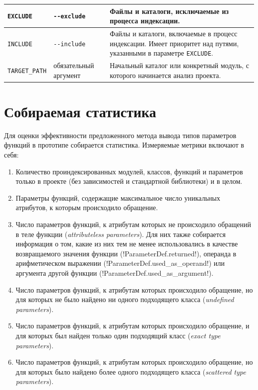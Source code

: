 \begin{table}[H]
\begin{tabularx}{\textwidth}{ |X|X|X| }
    \texttt{EXCLUDE} & \texttt{-{}-exclude} & Файлы и каталоги, исключаемые из
    процесса индексации.
    \\ \hline

    \texttt{INCLUDE} & \texttt{-{}-include} & Файлы и каталоги, включаемые в
    процесс индексации. Имеет приоритет над путями, указанными в параметре
    \texttt{EXCLUDE}.
    \\ \hline

    \texttt{TARGET\_PATH} & обязательный аргумент & Начальный каталог или
    конкретный модуль, с которого начинается анализ проекта.
    \\ \hline

  \end{tabularx}
\end{table}

\section{Собираемая статистика}
\label{sec:statistics-collecting}

Для оценки эффективности предложенного метода вывода типов параметров функций
в прототипе собирается статистика. Измеряемые метрики включают в себя:

\begin{enumerate}
  \item Количество проиндексированных модулей, классов, функций и параметров
    только в проекте (без зависимостей и стандартной библиотеки) и в целом.

  \item Параметры функций, содержащие максимальное число уникальных атрибутов, к
    которым происходило обращение.

  \item Число параметров функций, к атрибутам которых не происходило обращений в теле
    функции (\emph{attributeless parameters}). Для них также собирается
    информация о том, какие из них тем не менее использовались в качестве
    возвращаемого значения функции (!ParameterDef.returned!), операнда в
    арифметическом выражении (!ParameterDef.used_as_operand!) или аргумента
    другой функции (!ParameterDef.used_as_argument!).

  \item Число параметров функций, к атрибутам которых происходило обращение, но для
    которых не было найдено ни одного подходящего класса (\emph{undefined
      parameters}).

  \item Число параметров функций, к атрибутам которых происходило обращение, и для
    которых был найден только один подходящий класс (\emph{exact type parameters}).

  \item Число параметров функций, к атрибутам которых происходило обращение, но для
    которых было найдено более одного подходящего класса (\emph{scattered type
      parameters}).

\end{enumerate}

